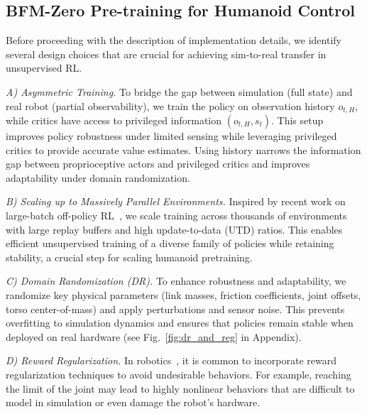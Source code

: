\subsection{BFM-Zero Pre-training for Humanoid Control}
\label{sec:pretrain}
\vspace{-3mm}
Before proceeding with the description of implementation details, we identify several design choices that are crucial for achieving sim-to-real transfer in unsupervised RL.


\textit{A) Asymmetric Training.} To bridge the gap between simulation (full state) and real robot (partial observability), we train the policy on observation history $o_{t,H}$, while critics have access to privileged information $(o_{t,H}, s_t)$. This setup improves policy robustness under limited sensing while leveraging privileged critics to provide accurate value estimates. Using history narrows the information gap between proprioceptive actors and privileged critics and improves adaptability under domain randomization.


\textit{B) Scaling up to Massively Parallel Environments.} Inspired by recent work on large-batch off-policy RL~\citep{Seo2025fasttd3}, we scale training across thousands of environments with large replay buffers and high update-to-data (UTD) ratios. This enables efficient unsupervised training of a diverse family of policies while retaining stability, a crucial step for scaling humanoid pretraining.


\textit{C) Domain Randomization (DR).} To enhance robustness and adaptability, we randomize key physical parameters (link masses, friction coefficients, joint offsets, torso center-of-mass) and apply perturbations and sensor noise. This prevents overfitting to simulation dynamics and ensures that policies remain stable when deployed on real hardware (see  Fig.~\ref{fig:dr_and_reg} in Appendix).

\textit{D) Reward Regularization.} In robotics~\citep[e.g.,][]{he2025asap,Zakka2025mujocoplayground}, it is common to incorporate reward regularization techniques to avoid undesirable behaviors. For example, reaching the limit of the joint may lead to highly nonlinear behaviors that are difficult to model in simulation or even damage the robot's hardware.

